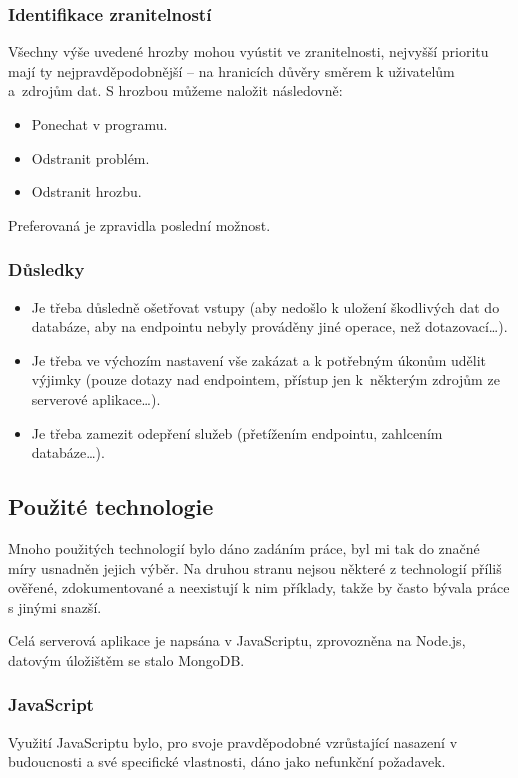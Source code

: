 \subsubsection{Identifikace zranitelností}
Všechny výše uvedené hrozby mohou vyústit ve zranitelnosti, nejvyšší prioritu mají ty nejpravděpodobnější -- na hranicích důvěry směrem k uživatelům a~zdrojům dat. S hrozbou můžeme naložit následovně:
\begin{itemize}
 \item Ponechat v programu.
 \item Odstranit problém.
 \item Odstranit hrozbu.
\end{itemize}
Preferovaná je zpravidla poslední možnost.

\subsubsection{Důsledky}
\begin{itemize}
 \item Je třeba důsledně ošetřovat vstupy (aby nedošlo k uložení škodlivých dat do databáze, aby na  endpointu nebyly prováděny jiné operace, než dotazovací\dots).
 \item Je třeba ve výchozím nastavení vše zakázat a k potřebným úkonům udělit výjimky (pouze dotazy nad  endpointem, přístup jen k~některým zdrojům ze serverové aplikace\dots).
 \item Je třeba zamezit odepření služeb (přetížením  endpointu, zahlcením databáze\dots).
\end{itemize}


\subsection{Použité technologie}
\label{sec:server:technologies}
Mnoho použitých technologií bylo dáno zadáním práce, byl mi tak do značné míry usnadněn jejich výběr. Na druhou stranu nejsou některé z technologií příliš ověřené, zdokumentované a neexistují k nim příklady, takže by často bývala práce s jinými snazší.

Celá serverová aplikace je napsána v JavaScriptu, zprovozněna na Node.js, datovým úložištěm se stalo MongoDB.

\subsubsection{JavaScript}
Využití JavaScriptu bylo, pro svoje pravděpodobné vzrůstající nasazení v budoucnosti a své specifické vlastnosti, dáno jako nefunkční požadavek.

